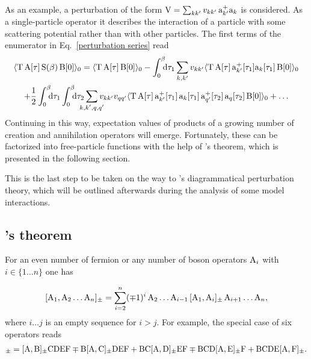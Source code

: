 As an example, a perturbation of the form $\mathrm V = \sum_{k k'} v_{k k'} \, \mathrm
a_{k'}^+ \mathrm a_k$ is considered. As a single-particle operator it describes the
interaction of a particle with some scattering potential rather than with other
particles. The first terms of the enumerator in Eq.~\ref{perturbation series}
read
%
\begin{gather*}
    \av{\op T \, \op A[\tau] \, \op S(\beta) \, \op B[0]}_0 =
    \av{\op T \, \op A[\tau] \, \op B[0]}_0 -
    \int \from 0 \till \beta \D \tau_1
    \sum_{k, k'} v_{k k'}
    \av{
        \op T \, \op A[\tau] \,
        \op a_{k'}^+[\tau_1] \op a_k[\tau_1] \,
        \op B[0]
    }_0 \\ + \frac 1 2
    \int \from 0 \till \beta \D \tau_1
    \int \from 0 \till \beta \D \tau_2
    \sum_{\mathclap{k, k', q, q'}} v_{k k'} v_{q q'}
    \av{
        \op T \, \op A[\tau] \,
        \op a_{k'}^+[\tau_1] \, \op a_k[\tau_1] \,
        \op a_{q'}^+[\tau_2] \, \op a_q[\tau_2] \,
        \op B[0]
    }_0 + \dots
\end{gather*}
%
Continuing in this way, expectation values of products of a growing number of
creation and annihilation operators will emerge. Fortunately, these can be
factorized into free-particle  functions with the help of
's theorem, which is presented in the following section.

This is the last step to be taken on the way to 's diagrammatical
perturbation theory, which will be outlined afterwards during the analysis of
some model interactions.

\subsection{'s theorem}

For an even number of fermion or any number of boson operators $\mathrm A_i$ with $i
\in \{ 1 \dots n \}$ one has

\begin{equation} \label{left to right}
    [\mathrm A_1, \mathrm A_2 \dots \mathrm A_n]_\pm =
    \sum_{i = 2}^n (\mp 1)^i \,
    \mathrm A_2 \dots \mathrm A_{i - 1} \,
    [\mathrm A_1, \mathrm A_i]_\pm \,
    \mathrm A_{i + 1} \dots \mathrm A_n,
\end{equation}
%
where $i \dots j$ is an empty sequence for $i > j$. For example, the special
case of six operators reads
%
\begin{align*}
        [\op A, \op B \op C \op D \op E \op F]_\pm
    =   [\op A, \op B]_\pm \op C \op D \op E \op F
    \mp \op B [\op A, \op C]_\pm \op D \op E \op F
    +   \op B \op C [\op A, \op D]_\pm \op E \op F
    \mp \op B \op C \op D [\op A, \op E]_\pm \op F
    +   \op B \op C \op D \op E [\op A, \op F]_\pm.
\end{align*}

